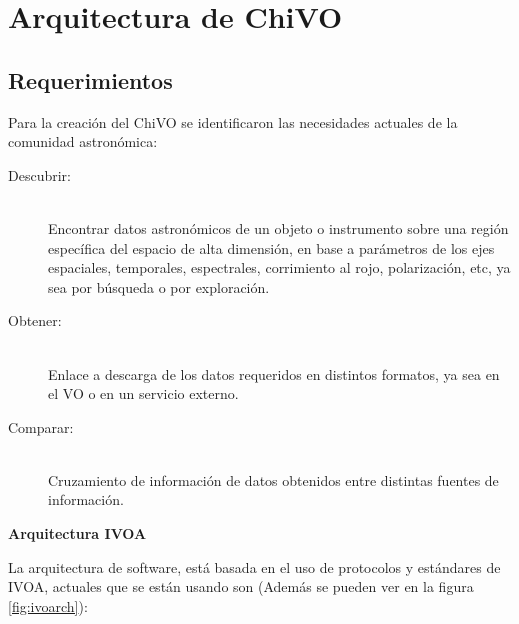 \section{Arquitectura de ChiVO}

\subsection{Requerimientos}

Para la creación del ChiVO se identificaron las necesidades actuales de la comunidad
astronómica:

\begin{description}
    \item[Descubrir:] \hfill \\
        Encontrar datos astronómicos de un objeto o instrumento sobre una región
        específica del espacio de alta dimensión, en base a parámetros de los ejes
        espaciales, temporales, espectrales, corrimiento al rojo, polarización, etc,
        ya sea por búsqueda o por exploración.
    \item[Obtener:] \hfill \\
        Enlace a descarga de los datos requeridos en distintos formatos, ya sea en
        el VO o en un servicio externo.
    \item[Comparar:] \hfill \\
        Cruzamiento de información de datos obtenidos entre distintas fuentes de
        información.
\end{description}


\textbf{Arquitectura IVOA}

La arquitectura de software, está basada en el uso de protocolos y estándares de
IVOA, actuales que se están usando son (Además se pueden ver en la figura \ref{fig:ivoarch}):

